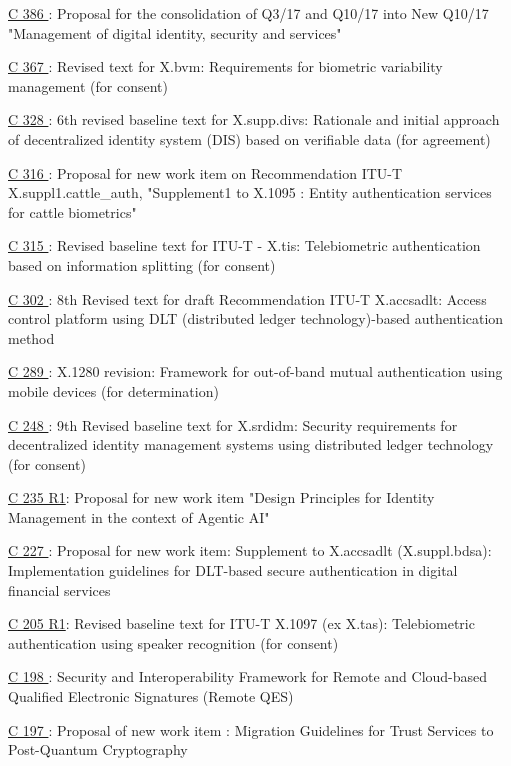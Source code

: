 \href{https://www.itu.int/md/meetingdoc.asp?lang=en\&parent=T25-SG17-C-0386}{C 386 }: Proposal for the consolidation of Q3/17 and Q10/17 into New Q10/17 "Management of digital identity, security and services"

\href{https://www.itu.int/md/meetingdoc.asp?lang=en\&parent=T25-SG17-C-0367}{C 367 }: Revised text for X.bvm: Requirements for biometric variability management (for consent)

\href{https://www.itu.int/md/meetingdoc.asp?lang=en\&parent=T25-SG17-C-0328}{C 328 }: 6th revised baseline text for X.supp.divs: Rationale and initial approach of decentralized identity system (DIS) based on verifiable data (for agreement)

\href{https://www.itu.int/md/meetingdoc.asp?lang=en\&parent=T25-SG17-C-0316}{C 316 }: Proposal for new work item on Recommendation ITU-T X.suppl1.cattle\_auth, "Supplement1 to X.1095 : Entity authentication services for cattle biometrics"

\href{https://www.itu.int/md/meetingdoc.asp?lang=en\&parent=T25-SG17-C-0315}{C 315 }: Revised baseline text for  ITU-T - X.tis: Telebiometric authentication based on information splitting (for consent)

\href{https://www.itu.int/md/meetingdoc.asp?lang=en\&parent=T25-SG17-C-0302}{C 302 }: 8th Revised text for draft Recommendation ITU-T X.accsadlt: Access control platform using DLT (distributed ledger technology)-based authentication method

\href{https://www.itu.int/md/meetingdoc.asp?lang=en\&parent=T25-SG17-C-0289}{C 289 }: X.1280 revision: Framework for out-of-band mutual authentication using mobile devices (for determination)

\href{https://www.itu.int/md/meetingdoc.asp?lang=en\&parent=T25-SG17-C-0248}{C 248 }: 9th Revised baseline text for X.srdidm: Security requirements for decentralized identity management systems using distributed ledger technology (for consent)

\href{https://www.itu.int/md/meetingdoc.asp?lang=en\&parent=T25-SG17-C-0235}{C 235 R1}: Proposal for new work item "Design Principles for Identity Management in the context of Agentic AI"

\href{https://www.itu.int/md/meetingdoc.asp?lang=en\&parent=T25-SG17-C-0227}{C 227 }: Proposal for new work item: Supplement to X.accsadlt (X.suppl.bdsa): Implementation guidelines for DLT-based secure authentication in digital financial services

\href{https://www.itu.int/md/meetingdoc.asp?lang=en\&parent=T25-SG17-C-0205}{C 205 R1}: Revised baseline text for ITU-T X.1097 (ex X.tas): Telebiometric authentication using speaker recognition (for consent)

\href{https://www.itu.int/md/meetingdoc.asp?lang=en\&parent=T25-SG17-C-0198}{C 198 }: Security and Interoperability Framework for Remote and Cloud-based Qualified Electronic Signatures (Remote QES)

\href{https://www.itu.int/md/meetingdoc.asp?lang=en\&parent=T25-SG17-C-0197}{C 197 }: Proposal of new work item : Migration Guidelines for Trust Services to Post-Quantum Cryptography
